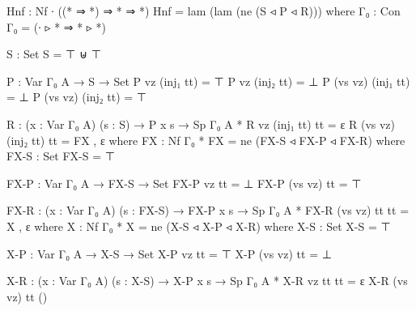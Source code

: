 \begin{code}
Hnf : Nf ∙ ((* ⇒ *) ⇒ * ⇒ *)
Hnf = lam (lam (ne (S ◃ P ◃ R)))
  where
  Γ₀ : Con
  Γ₀ = (∙ ▹ * ⇒ * ▹ *)

  S : Set
  S = ⊤ ⊎ ⊤

  P : Var Γ₀ A → S → Set
  P vz (inj₁ tt) = ⊤
  P vz (inj₂ tt) = ⊥
  P (vs vz) (inj₁ tt) = ⊥
  P (vs vz) (inj₂ tt) = ⊤

  R : (x : Var Γ₀ A) (s : S) → P x s → Sp Γ₀ A *
  R vz (inj₁ tt) tt = ε
  R (vs vz) (inj₂ tt) tt = FX , ε
    where
    FX : Nf Γ₀ *
    FX = ne (FX-S ◃ FX-P ◃ FX-R)
      where
      FX-S : Set
      FX-S = ⊤

      FX-P : Var Γ₀ A → FX-S → Set
      FX-P vz tt = ⊥
      FX-P (vs vz) tt = ⊤

      FX-R : (x : Var Γ₀ A) (s : FX-S) → FX-P x s → Sp Γ₀ A *
      FX-R (vs vz) tt tt = X , ε
        where
        X : Nf Γ₀ *
        X = ne (X-S ◃ X-P ◃ X-R)
          where
          X-S : Set
          X-S = ⊤

          X-P : Var Γ₀ A → X-S → Set
          X-P vz tt = ⊤
          X-P (vs vz) tt = ⊥

          X-R : (x : Var Γ₀ A) (s : X-S) → X-P x s → Sp Γ₀ A *
          X-R vz tt tt = ε
          X-R (vs vz) tt ()
\end{code}